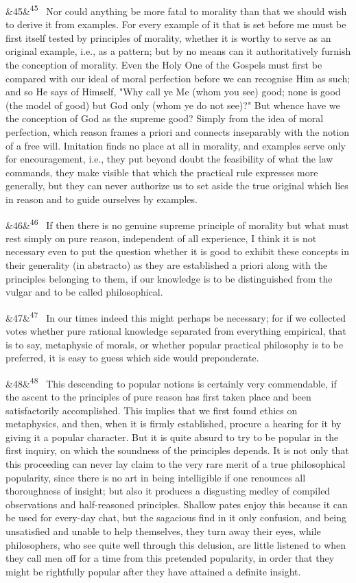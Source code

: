 \documentclass[12pt]{article}
\newcommand{\para}[1][]{\par\noindent\ifx&#1&\else\textsuperscript{\footnotesize #1}~\fi}
\begin{document}
\para[45] Nor could anything be more fatal to morality than that we should wish to derive it from examples. For every example of it that is set before me must be first itself tested by principles of morality, whether it is worthy to serve as an original example, i.e., as a pattern; but by no means can it authoritatively furnish the conception of morality. Even the Holy One of the Gospels must first be compared with our ideal of moral perfection before we can recognise Him as such; and so He says of Himself, "Why call ye Me (whom you see) good; none is good (the model of good) but God only (whom ye do not see)?" But whence have we the conception of God as the supreme good? Simply from the idea of moral perfection, which reason frames a priori and connects inseparably with the notion of a free will. Imitation finds no place at all in morality, and examples serve only for encouragement, i.e., they put beyond doubt the feasibility of what the law commands, they make visible that which the practical rule expresses more generally, but they can never authorize us to set aside the true original which lies in reason and to guide ourselves by examples.

\para[46] If then there is no genuine supreme principle of morality but what must rest simply on pure reason, independent of all experience, I think it is not necessary even to put the question whether it is good to exhibit these concepts in their generality (in abstracto) as they are established a priori along with the principles belonging to them, if our knowledge is to be distinguished from the vulgar and to be called philosophical.

\para[47] In our times indeed this might perhaps be necessary; for if we collected votes whether pure rational knowledge separated from everything empirical, that is to say, metaphysic of morals, or whether popular practical philosophy is to be preferred, it is easy to guess which side would preponderate.

\para[48] This descending to popular notions is certainly very commendable, if the ascent to the principles of pure reason has first taken place and been satisfactorily accomplished. This implies that we first found ethics on metaphysics, and then, when it is firmly established, procure a hearing for it by giving it a popular character. But it is quite absurd to try to be popular in the first inquiry, on which the soundness of the principles depends. It is not only that this proceeding can never lay claim to the very rare merit of a true philosophical popularity, since there is no art in being intelligible if one renounces all thoroughness of insight; but also it produces a disgusting medley of compiled observations and half-reasoned principles. Shallow pates enjoy this because it can be used for every-day chat, but the sagacious find in it only confusion, and being unsatisfied and unable to help themselves, they turn away their eyes, while philosophers, who see quite well through this delusion, are little listened to when they call men off for a time from this pretended popularity, in order that they might be rightfully popular after they have attained a definite insight.
\end{document}
